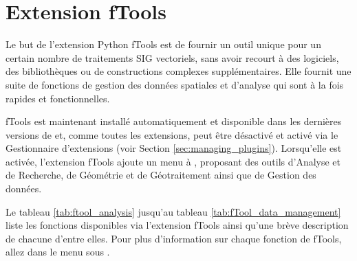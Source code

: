 \section{Extension fTools}\label{sec:ftools}


Le but de l'extension Python fTools est de fournir un outil unique pour un certain nombre de traitements SIG vectoriels, sans avoir recourt à des logiciels, des bibliothèques ou de constructions complexes supplémentaires. Elle fournit une suite de fonctions de gestion des données spatiales et d'analyse qui sont à la fois rapides et fonctionnelles.

fTools est maintenant installé automatiquement et disponible dans les dernières versions de \qg et, comme toutes les extensions, peut être désactivé et activé via le Gestionnaire d'extensions (voir Section \ref{sec:managing_plugins}). Lorsqu'elle est activée, l'extension fTools ajoute un menu  à \qg, proposant des outils d'Analyse et de Recherche, de Géométrie et de Géotraitement ainsi que de Gestion des données.

\label{ftool_functions}

Le tableau \ref{tab:ftool_analysis} jusqu'au tableau \ref{tab:fTool_data_management} liste les fonctions disponibles via l'extension fTools ainsi qu'une brève description de chacune d'entre elles. Pour plus d'information sur chaque fonction de fTools, allez dans le menu  sous .

